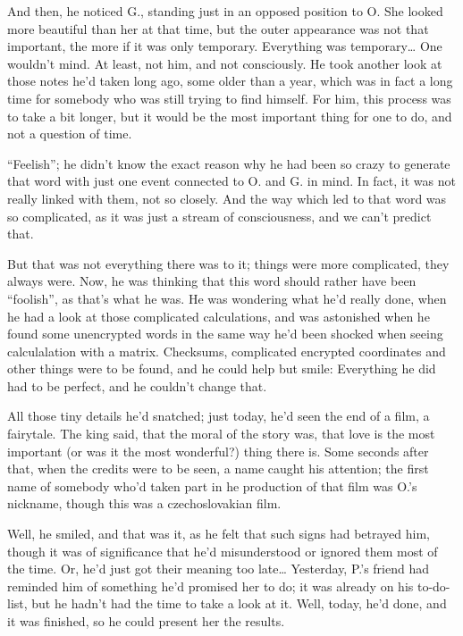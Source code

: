 And then, he noticed G., standing just in an opposed position to O. She looked more beautiful than her at that time, but the outer appearance was not that important, the more if it was only temporary. 
Everything was temporary\dots{}
One wouldn't mind. At least, not him, and not consciously. 
He took another look at those notes he'd taken long ago, some older than a year, which was in fact a long time for somebody who was still trying to find himself. For him, this process was to take a bit longer, but it would be the most important thing for one to do, and not a question of time.

\enquote{Feelish}; he didn't know the exact reason why he had been so crazy to generate that word with just one event connected to O. and G. in mind. In fact, it was not really linked with them, not so closely. And the way which led to that word was so complicated, as it was just a stream of consciousness, and we can't predict that.

But that was not everything there was to it; things were more complicated, they always were. Now, he was thinking that this word should rather have been \enquote{foolish}, as that's what he was. He was wondering what he'd really done, when he had a look at those complicated calculations, and was astonished when he found some unencrypted words in the same way he'd been shocked when seeing calculalation with a matrix. Checksums, complicated encrypted coordinates and other things were to be found, and he could help but smile: Everything he did had to be perfect, and he couldn't change that.

All those tiny details he'd snatched; just today, he'd seen the end of a film, a fairytale. The king said, that the moral of the story was, that love is the most important (or was it the most wonderful?) thing there is. Some seconds after that, when the credits were to be seen, a name caught his attention; the first name of somebody who'd taken part in he production of that film was O.'s nickname, though this was a czechoslovakian film.

Well, he smiled, and that was it, as he felt that such signs had betrayed him, though it was of significance that he'd misunderstood or ignored them most of the time. 
Or, he'd just got their meaning too late\dots{}
Yesterday, P.'s friend had reminded him of something he'd promised her to do; it was already on his to-do-list, but he hadn't had the time to take a look at it. Well, today, he'd done, and it was finished, so he could present her the results.

